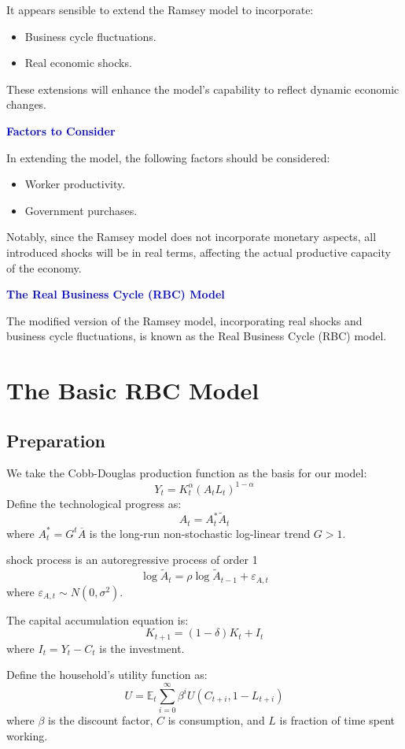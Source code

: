 It appears sensible to extend the Ramsey model to incorporate:
\begin{itemize}
  \item Business cycle fluctuations.
  \item Real economic shocks.
\end{itemize}
These extensions will enhance the model's capability to reflect dynamic economic changes.

\textcolor{blue}{\textbf{Factors to Consider}}

In extending the model, the following factors should be considered:
\begin{itemize}
  \item Worker productivity.
  \item Government purchases.
\end{itemize}
Notably, since the Ramsey model does not incorporate monetary aspects, all introduced shocks will be in real terms, affecting the actual productive capacity of the economy.

\textcolor{blue}{\textbf{The Real Business Cycle (RBC) Model}}

The modified version of the Ramsey model, incorporating real shocks and business cycle fluctuations, is known as the Real Business Cycle (RBC) model.

\section{The Basic RBC Model}

\subsection{Preparation}
We take the Cobb-Douglas production function as the basis for our model:
\[ Y_t = K_t^{\alpha} (A_t L_t)^{1 - \alpha} \]
Define the technological progress as:
\[ A_t = A_t^* \tilde{A}_t \]
where $A_t^* = G^t \overline{A} $ is the long-run non-stochastic log-linear trend $G>1$.

shock process is an autoregressive process of order 1
\[\log \tilde{A}_t = \rho \log \tilde{A}_{t-1} + \varepsilon_{A, t} \]
where $\varepsilon_{A, t} \sim N(0, \sigma^2)$.

The capital accumulation equation is:
\[ K_{t+1} = (1 - \delta) K_t + I_t \]
where $I_t = Y_t - C_t$ is the investment.

Define the household's utility function as:
\[ U = \mathbb{E}_t \sum_{i=0}^{\infty} \beta^i U(C_{t+i}, 1-L_{t+i} )\]
where $\beta$ is the discount factor, $C$ is consumption, and $L$ is fraction of time spent working.

